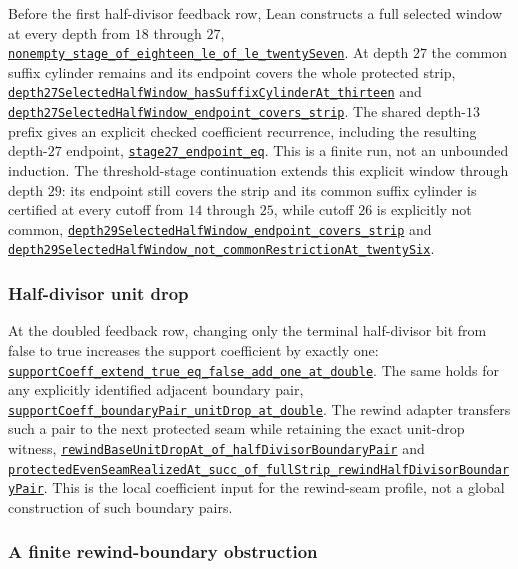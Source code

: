 \documentclass[11pt]{article}
\newcommand{\commit}{81150c1c6fdd4cd51e76d3aa0de344341e0e9e7c}
\newcommand{\repobase}{https://github.com/wcook04/plectis-lean-erdos249-257/blob/\commit}
\newcommand{\PK}{Erdos249257}
\newcommand{\lref}[3]{\href{\repobase/\PK/#1\#L#2}{\nolinkurl{#3}}}
\newcommand{\lrefx}[3]{\href{\repobase/\PK/#1\#L#2}{\nolinkurl{#3}}}
\theoremstyle{definition}
\theoremstyle{remark}
\begin{document}
Before the first half-divisor feedback row, Lean constructs a full selected
window at every depth from $18$ through $27$,
\lref{SelectedSuffixCylinderPreFeedback.lean}{118}{nonempty_stage_of_eighteen_le_of_le_twentySeven}.
At depth $27$ the common suffix cylinder remains and its endpoint covers the
whole protected strip,
\lrefx{SelectedSuffixCylinderPreFeedback.lean}{141}{depth27SelectedHalfWindow_hasSuffixCylinderAt_thirteen}
and
\lrefx{SelectedSuffixCylinderPreFeedback.lean}{147}{depth27SelectedHalfWindow_endpoint_covers_strip}.
The shared depth-$13$ prefix gives an explicit checked coefficient recurrence,
including the resulting depth-$27$ endpoint,
\lrefx{SuffixCylinderFirstFeedback.lean}{144}{stage27_endpoint_eq}.
This is a finite run, not an unbounded induction.
The threshold-stage continuation extends this explicit window through depth
$29$: its endpoint still covers the strip and its common suffix cylinder is
certified at every cutoff from $14$ through $25$, while cutoff $26$ is
explicitly not common,
\lrefx{SuffixCylinderThreshold.lean}{700}{depth29SelectedHalfWindow_endpoint_covers_strip}
and
\lrefx{SuffixCylinderThreshold.lean}{806}{depth29SelectedHalfWindow_not_commonRestrictionAt_twentySix}.

\subsubsection{Half-divisor unit drop}\label{res:halfdivisordrop}

At the doubled feedback row, changing only the terminal half-divisor bit from
false to true increases the support coefficient by exactly one:
\lref{HalfDivisorUnitDrop.lean}{20}{supportCoeff_extend_true_eq_false_add_one_at_double}.
The same holds for any explicitly identified adjacent boundary pair,
\lrefx{HalfDivisorUnitDrop.lean}{35}{supportCoeff_boundaryPair_unitDrop_at_double}.
The rewind adapter transfers such a pair to the next protected seam while
retaining the exact unit-drop witness,
\lrefx{RewindHalfDivisorAdapter.lean}{86}{rewindBaseUnitDropAt_of_halfDivisorBoundaryPair}
and
\lrefx{RewindHalfDivisorAdapter.lean}{147}{protectedEvenSeamRealizedAt_succ_of_fullStrip_rewindHalfDivisorBoundaryPair}.
This is the local coefficient input for the rewind-seam profile, not a global
construction of such boundary pairs.

\subsubsection{A finite rewind-boundary obstruction}\label{res:rewindboundarycounterexample}
\end{document}
